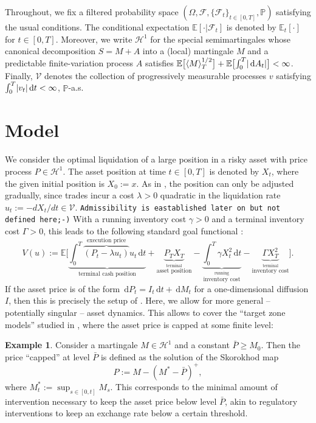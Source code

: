 \documentclass[11pt]{article}
\theoremstyle{definition}
\newtheorem{eg}[thm]{Example}
\theoremstyle{remark}
\newcommand{\E}{\mathbb{E}} %
\renewcommand{\P}{\mathbb{P}} %
\newcommand{\F}{\mathcal{F}} %
\DeclarePairedDelimiter{\abs}{\lvert}{\rvert} %
\newcommand{\ts}{\textstyle}
\newcommand{\de}{\,\mathrm{d}}
\begin{document}
Throughout, we fix a filtered probability space $(\Omega, \F, \{\F_t\}_{t\in[0,T]}, \P)$ satisfying the usual conditions. The conditional expectation $\E[\cdot \vert \F_t]$ is denoted by $\E_t[\cdot]$ for $t\in[0,T]$. Moreover, we write $\mathcal{H}^1$ for the special semimartingales whose canonical decomposition $S=M+A$ into a (local) martingale $M$ and a predictable finite-variation process $A$ satisfies $\E\bigl[\langle M\rangle^{1/2}_T\bigr] + \E\bigl[\int_0^T \abs{\de A_t}\bigr] < \infty$. Finally, $\mathcal{V}$ denotes the collection of progressively measurable processes $v$ satisfying $\int_0^T \abs{v_t} \de t < \infty$, $\P$-a.s.


\section{Model}\label{s:model}

We consider the optimal liquidation of a large position in a risky asset with price process $P \in \mathcal{H}^1$. The asset position at time $t \in [0,T]$ is denoted by $X_t$, where the given initial position is $X_0:=x$. As in \cite{almgren.chriss.01}, the position can only be adjusted gradually, since trades incur a cost $\lambda>0$ quadratic in the liquidation rate $u_t := -dX_t/dt \in \mathcal{V}$. \texttt{Admissibility is eastablished later on but not defined here;-)}
With a running inventory cost $\gamma>0$ and a terminal inventory cost $\Gamma>0$, this leads to the following standard goal functional \cite{almgren.chriss.01,???}:
\[
\ts V(u):= \E\Bigg[\underbrace{\int_0^T \overbrace{(P_t - \lambda u_t)}^{\textrm{execution price}} u_t \de t}_{\textrm{terminal cash position}} + \underbrace{P_T X_T}_{\stackrel{\textrm{terminal}}{\textrm{asset position}}} - \underbrace{\int_0^T \gamma X_t^2 \de t}_{\stackrel{\textrm{running}}{\textrm{inventory cost}}} - \underbrace{\Gamma X_T^2}_{\stackrel{\textrm{terminal}}{\textrm{inventory cost}}} \Bigg].
\]
If the asset price is of the form $\de P_t = I_t \de t + \de M_t$ for a one-dimensional diffusion $I$, then this is precisely the setup of \cite{lehalle2017incorporating}. Here, we allow for more general -- potentially singular -- asset dynamics. This allows to cover the ``target zone models'' studied in \cite{neumann.schied.??}, where the asset price is capped at some finite level:

\begin{eg}\label{ex:target}
Consider a martingale $M\in\mathcal{H}^1$ and a constant $\bar{P} \geq M_0$. Then the price ``capped'' at level $\bar{P}$ is defined as the solution of the Skorokhod map 
$$P:=M-(M^*-\bar{P})^+,$$
where $M^*_t:=\sup_{s\in[0,t]} M_s$. This corresponds to the minimal amount of intervention necessary to keep the asset price below level $\bar{P}$, akin to regulatory interventions to keep an exchange rate below a certain threshold.
\end{eg}
\end{document}

